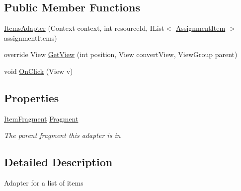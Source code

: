 \subsection*{Public Member Functions}
\begin{DoxyCompactItemize}
\item 
\hyperlink{class_field_service_1_1_android_1_1_items_adapter_aa6fabcf6e987d6dba358b518639ee62e}{Items\+Adapter} (Context context, int resource\+Id, I\+List$<$ \hyperlink{class_field_service_1_1_data_1_1_assignment_item}{Assignment\+Item} $>$ assignment\+Items)
\item 
override View \hyperlink{class_field_service_1_1_android_1_1_items_adapter_a52ddfb453eca276ce97868ece6c62542}{Get\+View} (int position, View convert\+View, View\+Group parent)
\item 
void \hyperlink{class_field_service_1_1_android_1_1_items_adapter_a0755904b95602ac66c5200083caa2b71}{On\+Click} (View v)
\end{DoxyCompactItemize}
\subsection*{Properties}
\begin{DoxyCompactItemize}
\item 
\hyperlink{class_field_service_1_1_android_1_1_fragments_1_1_item_fragment}{Item\+Fragment} \hyperlink{class_field_service_1_1_android_1_1_items_adapter_af6f5da32e9633694ea033929c2f12d06}{Fragment}
\begin{DoxyCompactList}\small\item\em The parent fragment this adapter is in \end{DoxyCompactList}\end{DoxyCompactItemize}


\subsection{Detailed Description}
Adapter for a list of items 



